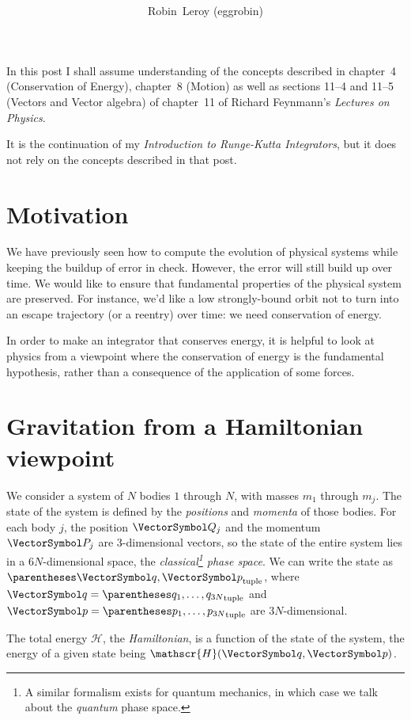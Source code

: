 \documentclass[10pt, a4paper, twoside]{basestyle}
\title{%
\textdisplay{%
An Introduction Hamiltonian Mechanics}%
}
\author{Robin~Leroy (eggrobin)}
\begin{document}
\maketitle
In this post I shall assume understanding of the concepts described in
chapter~4 (Conservation of Energy), chapter~8 (Motion) as well as sections
11--4 and 11--5 (Vectors and Vector algebra) of chapter~11 of Richard
Feynmann's \emph{Lectures on Physics}.

It is the continuation of my \emph{Introduction to Runge-Kutta Integrators},
but it does not rely on the concepts described in that post.

\section{Motivation}
We have previously seen how to compute the evolution of physical systems while
keeping the buildup of error in check. However, the error will still build up
over time. We would like to ensure that fundamental properties of the physical
system are preserved. For instance, we'd like a low strongly-bound orbit not to
turn into an escape trajectory (or a reentry) over time: we need conservation
of energy.

In order to make an integrator that conserves energy, it is helpful to look at
physics from a viewpoint where the conservation of energy is the fundamental
hypothesis, rather than a consequence of the application of some forces.

\newcommand{\Hamiltonian}{\mathscr{H}}
\section{Gravitation from a Hamiltonian viewpoint}
We consider a system of $N$ bodies $1$ through $N$, with masses $m_1$ through
$m_j$. The state of the system is defined by the \emph{positions} and
\emph{momenta} of those bodies. For each body $j$, the position $\vQ_j$ and the
momentum $\vP_j$ are 3-dimensional vectors, so the state of the entire system
lies in a $6N$-dimensional space, the \emph{classical\footnote{A similar
formalism exists for quantum mechanics, in which case we talk about the
\emph{quantum} phase space.} phase space}.
We can write the state as $\tuple{\vq, \vp}$, where $\vq = \tuple{q_1, \dotsc,
q_{3N}}$ and $\vp =  \tuple{p_1, \dotsc, p_{3N}}$ are $3N$-dimensional.

The total energy $\Hamiltonian$, the \emph{Hamiltonian}, is a function
of the state of the system, the energy of a given state being $\Hamiltonian(\vq,
\vp)$.
\end{document}
